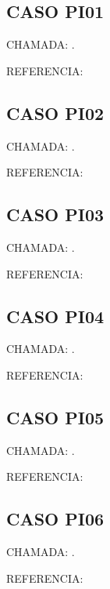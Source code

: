 \documentclass{undftex}
\begin{document}
\begin{refsection}\section*{CASO PI01} CHAMADA: . \textcite{v22}\par REFERENCIA:\par\printbibliography[heading=none,check=undfconsultadas]\end{refsection}\clearpage
\begin{refsection}\section*{CASO PI02} CHAMADA: . \textcite{pi02}\par REFERENCIA:\par\printbibliography[heading=none,check=undfconsultadas]\end{refsection}\clearpage
\begin{refsection}\section*{CASO PI03} CHAMADA: . \textcite{pi03}\par REFERENCIA:\par\printbibliography[heading=none,check=undfconsultadas]\end{refsection}\clearpage
\begin{refsection}\section*{CASO PI04} CHAMADA: . \textcite{pi04}\par REFERENCIA:\par\printbibliography[heading=none,check=undfconsultadas]\end{refsection}\clearpage
\begin{refsection}\section*{CASO PI05} CHAMADA: . \textcite{pi05}\par REFERENCIA:\par\printbibliography[heading=none,check=undfconsultadas]\end{refsection}\clearpage
\begin{refsection}\section*{CASO PI06} CHAMADA: . \textcite{pi06}\par REFERENCIA:\par\printbibliography[heading=none,check=undfconsultadas]\end{refsection}\clearpage
\end{document}
